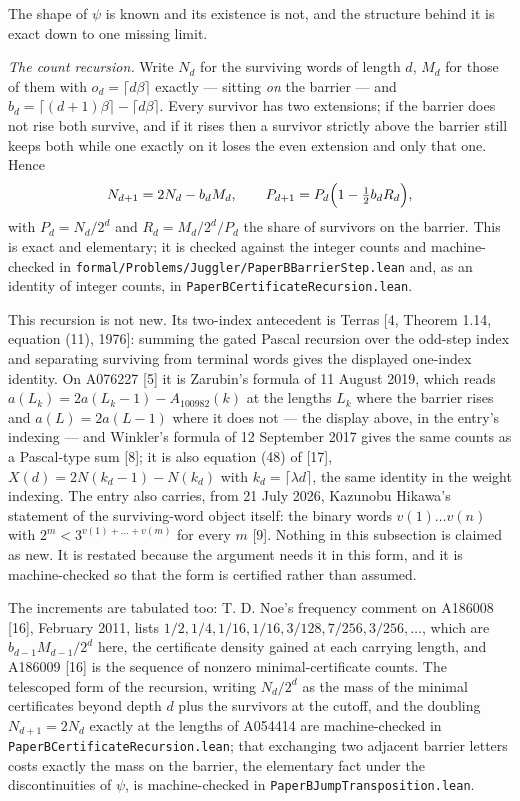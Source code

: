 \documentclass[11pt,a4paper]{article}
\begin{document}
The shape of \(\psi\) is known and its existence is not, and the
structure behind it is exact down to one missing limit.

\emph{The count recursion.} Write \(N_d\) for the surviving words of
length \(d\), \(M_d\) for those of them with \(o_d=\lceil d\beta\rceil\)
exactly --- sitting \emph{on} the barrier --- and
\(b_d=\lceil(d+1)\beta\rceil-
\lceil d\beta\rceil\). Every survivor has two extensions; if the barrier
does not rise both survive, and if it rises then a survivor strictly
above the barrier still keeps both while one exactly on it loses the
even extension and only that one. Hence \[
N_{d+1}=2N_d-b_dM_d,\qquad P_{d+1}=P_d\Bigl(1-\tfrac12 b_dR_d\Bigr),
\] with \(P_d=N_d/2^d\) and \(R_d=M_d/2^d\big/P_d\) the share of
survivors on the barrier. This is exact and elementary; it is checked
against the integer counts and machine-checked in
\texttt{formal/Problems/Juggler/PaperBBarrierStep.lean} and, as an
identity of integer counts, in \texttt{PaperBCertificateRecursion.lean}.

This recursion is not new. Its two-index antecedent is Terras {[}4,
Theorem 1.14, equation (11), 1976{]}: summing the gated Pascal recursion
over the odd-step index and separating surviving from terminal words
gives the displayed one-index identity. On A076227 {[}5{]} it is
Zarubin's formula of 11 August 2019, which reads
\(a(L_k)=2a(L_k-1)-A_{100982}(k)\) at the lengths \(L_k\) where the
barrier rises and \(a(L)=2a(L-1)\) where it does not --- the display
above, in the entry's indexing --- and Winkler's formula of 12 September
2017 gives the same counts as a Pascal-type sum {[}8{]}; it is also
equation (48) of {[}17{]}, \(X(d)=2N(k_d-1)-N(k_d)\) with
\(k_d=\lceil\lambda d\rceil\), the same identity in the weight indexing.
The entry also carries, from 21 July 2026, Kazunobu Hikawa's statement
of the surviving-word object itself: the binary words \(v(1)\dots v(n)\)
with \(2^m<3^{v(1)+\dots+v(m)}\) for every \(m\) {[}9{]}. Nothing in
this subsection is claimed as new. It is restated because the argument
needs it in this form, and it is machine-checked so that the form is
certified rather than assumed.

The increments are tabulated too: T. D. Noe's frequency comment on
A186008 {[}16{]}, February 2011, lists
\(1/2,1/4,1/16,1/16,3/128,7/256,3/256,\dots\), which are
\(b_{d-1}M_{d-1}/2^{d}\) here, the certificate density gained at each
carrying length, and A186009 {[}16{]} is the sequence of nonzero
minimal-certificate counts. The telescoped form of the recursion,
writing \(N_d/2^d\) as the mass of the minimal certificates beyond depth
\(d\) plus the survivors at the cutoff, and the doubling
\(N_{d+1}=2N_d\) exactly at the lengths of A054414 are machine-checked
in \texttt{PaperBCertificateRecursion.lean}; that exchanging two
adjacent barrier letters costs exactly the mass on the barrier, the
elementary fact under the discontinuities of \(\psi\), is
machine-checked in \texttt{PaperBJumpTransposition.lean}.
\end{document}
